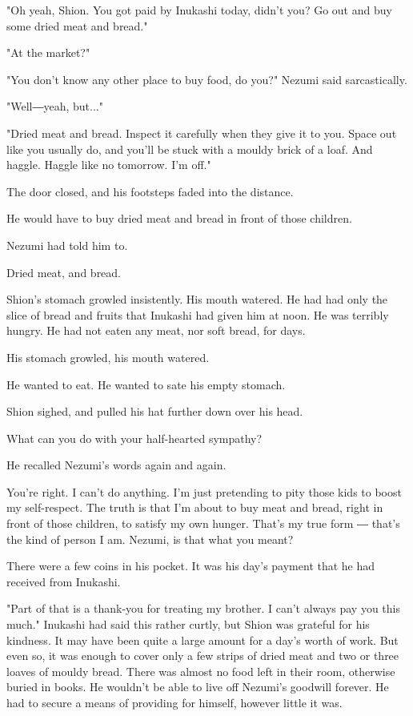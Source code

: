 "Oh yeah, Shion. You got paid by Inukashi today, didn't you? Go out and
buy some dried meat and bread."

"At the market?"

"You don't know any other place to buy food, do you?" Nezumi said
sarcastically.

"Well―yeah, but..."

"Dried meat and bread. Inspect it carefully when they give it to you.
Space out like you usually do, and you'll be stuck with a mouldy brick
of a loaf. And haggle. Haggle like no tomorrow. I'm off."

The door closed, and his footsteps faded into the distance.

He would have to buy dried meat and bread in front of those children.

Nezumi had told him to.

Dried meat, and bread.

Shion's stomach growled insistently. His mouth watered. He had had only
the slice of bread and fruits that Inukashi had given him at noon. He
was terribly hungry. He had not eaten any meat, nor soft bread, for
days.

His stomach growled, his mouth watered.

He wanted to eat. He wanted to sate his empty stomach.

Shion sighed, and pulled his hat further down over his head.

What can you do with your half-hearted sympathy?

He recalled Nezumi's words again and again.

You're right. I can't do anything. I'm just pretending to pity those
kids to boost my self-respect. The truth is that I'm about to buy meat
and bread, right in front of those children, to satisfy my own hunger.
That's my true form ― that's the kind of person I am. Nezumi, is that
what you meant?

There were a few coins in his pocket. It was his day's payment that he
had received from Inukashi.

"Part of that is a thank-you for treating my brother. I can't always pay
you this much." Inukashi had said this rather curtly, but Shion was
grateful for his kindness. It may have been quite a large amount for a
day's worth of work. But even so, it was enough to cover only a few
strips of dried meat and two or three loaves of mouldy bread. There was
almost no food left in their room, otherwise buried in books. He
wouldn't be able to live off Nezumi's goodwill forever. He had to secure
a means of providing for himself, however little it was.

